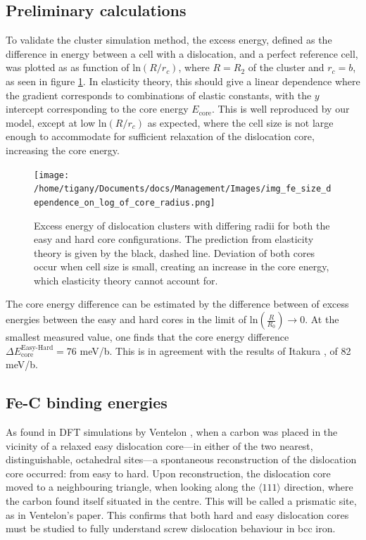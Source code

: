 \documentclass[a4paper,11pt]{article}
\begin{document}
\subsection{Preliminary calculations}
\label{sec:org88b2a28}


To validate the cluster simulation method, the excess energy, defined as the difference in energy
between a cell with a dislocation, and a perfect reference cell, was plotted as as function of
\(\text{ln}(R/r_c)\), where \(R = R_2\) of the cluster and \(r_c = b\), as seen in
figure \ref{lnrdep}. In elasticity theory, this should give a linear dependence where the gradient
corresponds to combinations of elastic constants, with the \(y\) intercept corresponding to the
core energy \(E_{\text{core}}\). This is well reproduced by our model, except at low \(\text{ln}(R/r_c)\)
as expected, where the cell size is not large enough to accommodate for sufficient relaxation of
the dislocation core, increasing the core energy.


\begin{figure}[htbp]
\centering
\texttt{[image: /home/tigany/Documents/docs/Management/Images/img\_fe\_size\_dependence\_on\_log\_of\_core\_radius.png]}
\caption{Excess energy of dislocation clusters with differing radii for both the easy and hard core configurations. The prediction from elasticity theory is given by the black, dashed line. Deviation of both cores occur when cell size is small, creating an increase in the core energy, which elasticity theory cannot account for. \label{lnrdep}}
\end{figure}




The core energy difference can be estimated by the difference between of excess energies between
the easy and hard cores in the limit of \(\text{ln}(\frac{R}{R_0}) \rightarrow 0\). At the smallest measured
value, one finds that the core energy difference \(\Delta E_{\text{core}}^{\text{Easy-Hard}} = 76\) meV/b. This is in
agreement with the results of Itakura \cite{Itakura2012}, of 82 meV/b.



\subsection{Fe-C binding energies}
\label{sec:org14201e5}



As found in DFT simulations by Ventelon \cite{Ventelon2015}, when a carbon was placed in the
vicinity of a relaxed easy dislocation core---in either of the two nearest, distinguishable,
octahedral sites---a spontaneous reconstruction of the dislocation core occurred: from easy to
hard. Upon reconstruction, the dislocation core moved to a neighbouring triangle, when looking
along the \(\langle 111\rangle\) direction, where the carbon found itself situated in the centre. This will be
called a prismatic site, as in Ventelon's paper. This confirms that both hard and easy
dislocation cores must be studied to fully understand screw dislocation behaviour in bcc iron.
\end{document}
